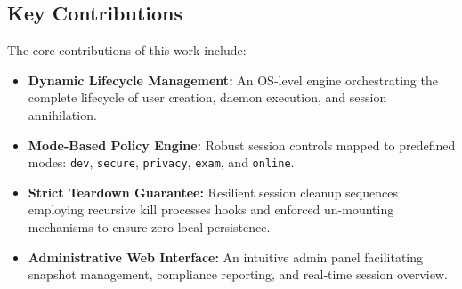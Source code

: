 \subsection{Key Contributions}
The core contributions of this work include:
\begin{itemize}
    \item \textbf{Dynamic Lifecycle Management:} An OS-level engine orchestrating the complete lifecycle of user creation, daemon execution, and session annihilation.
    \item \textbf{Mode-Based Policy Engine:} Robust session controls mapped to predefined modes: \texttt{dev}, \texttt{secure}, \texttt{privacy}, \texttt{exam}, and \texttt{online}.
    \item \textbf{Strict Teardown Guarantee:} Resilient session cleanup sequences employing recursive kill processes hooks and enforced un-mounting mechanisms to ensure zero local persistence.
    \item \textbf{Administrative Web Interface:} An intuitive admin panel facilitating snapshot management, compliance reporting, and real-time session overview.
\end{itemize}
